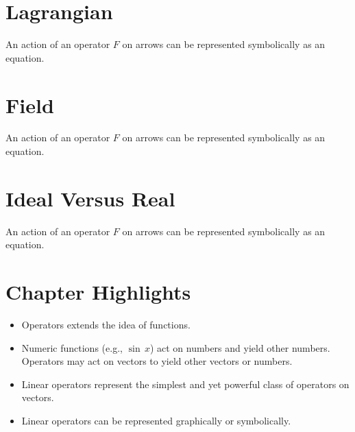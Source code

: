 \section{Lagrangian}\label{sec:Lagrangian}
An action of an operator $F$ on arrows can be represented symbolically
as an equation.

\section{Field}\label{sec:Field}
An action of an operator $F$ on arrows can be represented symbolically
as an equation.

\section{Ideal Versus Real}\label{sec:IdealVsReal}
An action of an operator $F$ on arrows can be represented symbolically
as an equation.



\section*{Chapter Highlights}
{\chhc
  \it  
\begin{itemize}
\item Operators extends the idea of functions.
\item Numeric functions (e.g., $\sin\,x$) act on numbers and yield
  other numbers. Operators may act on vectors to yield other vectors
  or numbers.
\item Linear operators represent the simplest and yet powerful class
  of operators on vectors.
\item Linear operators can be represented graphically or symbolically.
\end{itemize}

}
